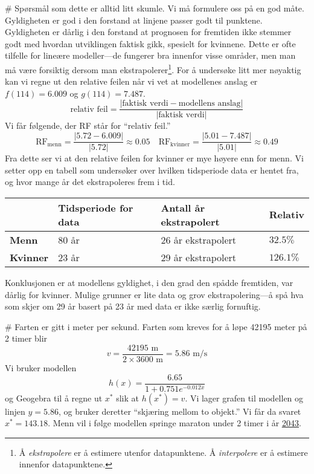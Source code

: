 \documentclass[12pt, a4paper]
{article}						%
\def\answer#1{\underline{\underline{#1}}}
\begin{document}
\begin{easylist}[enumerate]
	# Spørsmål som dette er alltid litt skumle. Vi må formulere oss på en god måte.
	Gyldigheten er god i den forstand at linjene passer godt til punktene.
	Gyldigheten er dårlig i den forstand at prognosen for fremtiden ikke stemmer godt med
	hvordan utviklingen faktisk gikk, spesielt for kvinnene. 
	Dette er ofte tilfelle for lineære modeller---de fungerer bra innenfor visse områder, men man må være forsiktig dersom man ekstrapolerer\footnote{Å \emph{ekstrapolere} er å estimere utenfor datapunktene. Å \emph{interpolere} er å estimere innenfor datapunktene.}.
	For å undersøke litt mer nøyaktig kan vi regne ut den relative feilen når vi vet at modellenes anslag er $f(114) = 6.009$ og $g(114) = 7.487$.
	\begin{equation*}
		\text{relativ feil} = \frac{| \text{faktisk verdi} - \text{modellens anslag}|}{|\text{faktisk verdi}|}
	\end{equation*}
	Vi får følgende, der RF står for ``relativ feil.''
	\begin{equation*}
		\text{RF}_{\text{menn}} = \frac{|5.72 - 6.009|}{|5.72|} \approx 0.05 \quad 
		\text{RF}_{\text{kvinner}} = \frac{|5.01 - 7.487|}{|5.01|} \approx 0.49
	\end{equation*}
	Fra dette ser vi at den relative feilen for kvinner er mye høyere enn for menn. 
	Vi setter opp en tabell som undersøker over hvilken tidsperiode data er hentet fra,
	og hvor mange år det ekstrapoleres frem i tid.
	\begin{center}
		\begin{tabular}{l|lll}
		&	\textbf{Tidsperiode for data} & \textbf{Antall år ekstrapolert} & \textbf{Relativ} \\ \hline
		\textbf{Menn} &	80 år & 26 år ekstrapolert & $32.5\%$ \\
		\textbf{Kvinner} &	23 år & 29 år ekstrapolert & $126.1\%$ 
		\end{tabular}
	\end{center}
	Konklusjonen er at modellens gyldighet, i den grad den spådde fremtiden, var dårlig for kvinner.
	Mulige grunner er lite data og grov ekstrapolering---å spå hva som skjer om 29 år basert på 23 år med data er ikke særlig fornuftig.
	
	
	# Farten er gitt i meter per sekund. Farten som kreves for å løpe 42195 meter på 2 timer blir
	\begin{equation*}
		v = \frac{42195\text{ m}}{2 \times 3600 \text{ m}} = 5.86 \text{ m/s}
	\end{equation*}
	Vi bruker modellen
	\begin{equation*}
		h(x) = \frac{6.65}{1 + 0.751e^{-0.012x}}
	\end{equation*}
	og Geogebra til å regne ut $x^*$ slik at $h(x^*) = v$. 
	Vi lager grafen til modellen og linjen $y = 5.86$, og bruker deretter ``skjæring mellom to objekt.''
	Vi får da svaret $x^* = 143.18$. Menn vil i følge modellen springe maraton under 2 timer i år \answer{2043}.
	
	


\end{easylist}
\end{document}
